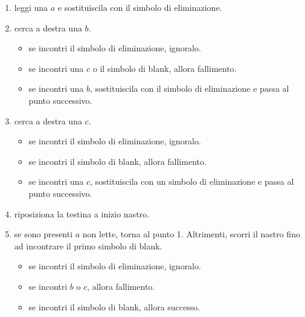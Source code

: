\begin{enumerate}
    \item leggi una $a$ e sostituiscila con il simbolo di eliminazione.
    \item cerca a destra una $b$.
    \begin{itemize}
        \item se incontri il simbolo di eliminazione, ignoralo.
        \item se incontri una $c$ o il simbolo di blank, allora fallimento.
        \item se incontri una $b$, sostituiscila con il simbolo di eliminazione e passa al punto successivo.
    \end{itemize}
    \item cerca a destra una $c$.
    \begin{itemize}
        \item se incontri il simbolo di eliminazione, ignoralo.
        \item se incontri il simbolo di blank, allora fallimento.
        \item se incontri una $c$, sostituiscila con un simbolo di eliminazione e passa al punto successivo.
    \end{itemize}
    \item riposiziona la testina a inizio nastro.
    \item se sono presenti $a$ non lette, torna al punto 1.
    Altrimenti, scorri il nastro fino ad incontrare il primo simbolo di blank.
    \begin{itemize}
        \item se incontri il simbolo di eliminazione, ignoralo.
        \item se incontri $b$ o $c$, allora fallimento.
        \item se incontri il simbolo di blank, allora successo.
    \end{itemize}
\end{enumerate}


